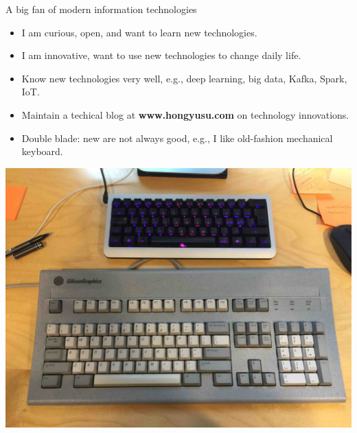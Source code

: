 \documentclass[first=dgreen,second=purple,logo=yellowexc]{aaltoslides}
\begin{document}
\begin{frame}{A big fan of modern information technologies}
	\begin{itemize}
		\item I am curious, open, and want to learn new technologies.
		\item I am innovative, want to use new technologies to change daily life.
		\item Know new technologies very well, e.g., deep learning, big data, Kafka, Spark, IoT.
		\item Maintain a techical blog at {\bf www.hongyusu.com} on technology innovations.
		\item Double blade: new are not always good, e.g., I like old-fashion mechanical keyboard. 
	\end{itemize}	
	\begin{center}
		\includegraphics[scale=0.03]{./plots/keyboard.jpg}
	\end{center}
\end{frame}
\fi
\end{document}
